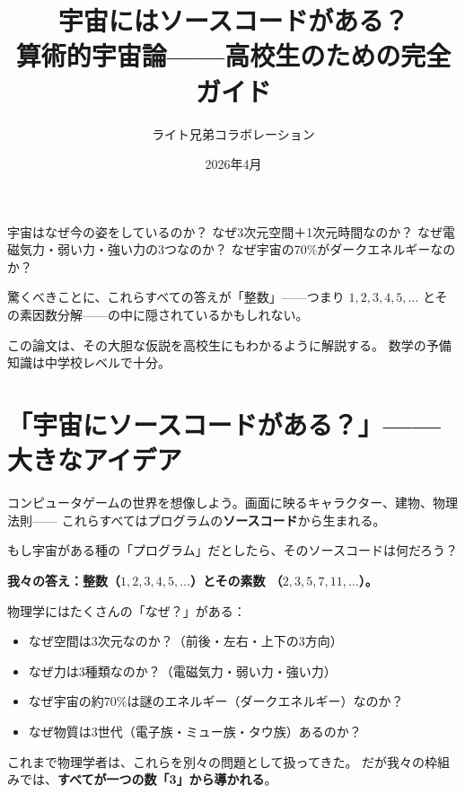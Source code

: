 \documentclass[12pt,a4paper]{article}
\title{\textbf{\Huge 宇宙にはソースコードがある？}\\[8pt]
\Large 算術的宇宙論——高校生のための完全ガイド}
\author{ライト兄弟コラボレーション}
\date{2026年4月}
\begin{document}
\maketitle

\begin{ideabox}[この論文について]
宇宙はなぜ今の姿をしているのか？ なぜ3次元空間＋1次元時間なのか？
なぜ電磁気力・弱い力・強い力の3つなのか？
なぜ宇宙の70\%がダークエネルギーなのか？

驚くべきことに、これらすべての答えが「整数」——つまり
$1, 2, 3, 4, 5, \ldots$ とその素因数分解——の中に隠されているかもしれない。

この論文は、その大胆な仮説を高校生にもわかるように解説する。
数学の予備知識は中学校レベルで十分。
\end{ideabox}

\tableofcontents
\newpage

\section{「宇宙にソースコードがある？」——大きなアイデア}

\begin{analogybox}[ソースコードのアナロジー]
コンピュータゲームの世界を想像しよう。画面に映るキャラクター、建物、物理法則——
これらすべてはプログラムの\textbf{ソースコード}から生まれる。

もし宇宙がある種の「プログラム」だとしたら、そのソースコードは何だろう？

\textbf{我々の答え：整数（$1, 2, 3, 4, 5, \ldots$）とその素数
（$2, 3, 5, 7, 11, \ldots$）。}
\end{analogybox}

物理学にはたくさんの「なぜ？」がある：
\begin{itemize}
\item なぜ空間は3次元なのか？（前後・左右・上下の3方向）
\item なぜ力は3種類なのか？（電磁気力・弱い力・強い力）
\item なぜ宇宙の約70\%は謎のエネルギー（ダークエネルギー）なのか？
\item なぜ物質は3世代（電子族・ミュー族・タウ族）あるのか？
\end{itemize}

これまで物理学者は、これらを別々の問題として扱ってきた。
だが我々の枠組みでは、\textbf{すべてが一つの数「3」から導かれる}。
\end{document}

